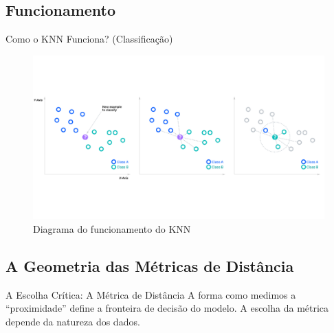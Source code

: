\documentclass{beamer}
\begin{document}
\subsection{Funcionamento}
\begin{frame}{Como o KNN Funciona? (Classificação)}
    \begin{figure}
        \centering
        \includegraphics[width=0.8\linewidth]{imagens/KNN.png}
        \caption{Diagrama do funcionamento do KNN \cite{ibm_knn_br}}
    \label{fig:diagramaknn}
    \end{figure}
\end{frame}
\subsection{A Geometria das Métricas de Distância}

\begin{frame}{A Escolha Crítica: A Métrica de Distância}
    A forma como medimos a ``proximidade'' define a fronteira de decisão do modelo. A escolha da métrica depende da natureza dos dados.


\end{frame}
\end{document}

